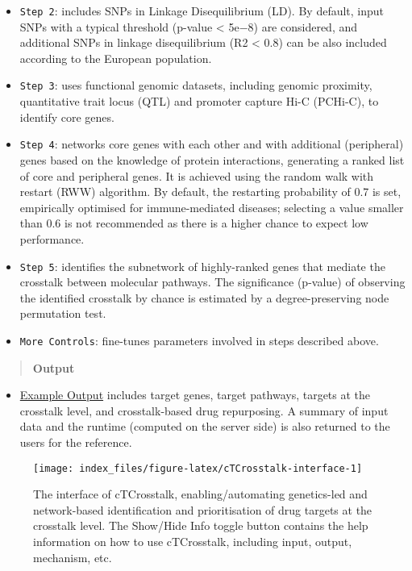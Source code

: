 \documentclass[
  oneside]{book}
\providecommand{\tightlist}{%
  \setlength{\itemsep}{0pt}\setlength{\parskip}{0pt}}
\begin{document}
\begin{itemize}
\item
  \texttt{Step\ 2}: includes SNPs in Linkage Disequilibrium (LD). By default, input SNPs with a typical threshold (p-value \textless{} 5e−8) are considered, and additional SNPs in linkage disequilibrium (R2 \textless{} 0.8) can be also included according to the European population.
\item
  \texttt{Step\ 3}: uses functional genomic datasets, including genomic proximity, quantitative trait locus (QTL) and promoter capture Hi-C (PCHi-C), to identify core genes.
\item
  \texttt{Step\ 4}: networks core genes with each other and with additional (peripheral) genes based on the knowledge of protein interactions, generating a ranked list of core and peripheral genes. It is achieved using the random walk with restart (RWW) algorithm. By default, the restarting probability of 0.7 is set, empirically optimised for immune-mediated diseases; selecting a value smaller than 0.6 is not recommended as there is a higher chance to expect low performance.
\item
  \texttt{Step\ 5}: identifies the subnetwork of highly-ranked genes that mediate the crosstalk between molecular pathways. The significance (p-value) of observing the identified crosstalk by chance is estimated by a degree-preserving node permutation test.
\item
  \texttt{More\ Controls}: fine-tunes parameters involved in steps described above.
\end{itemize}

\begin{quote}
\textbf{Output}
\end{quote}

\begin{itemize}
\tightlist
\item
  \href{http://www.genetictargets.com/app/examples/_tmp_RMD_cTCrosstalk.html}{Example Output} includes target genes, target pathways, targets at the crosstalk level, and crosstalk-based drug repurposing. A summary of input data and the runtime (computed on the server side) is also returned to the users for the reference.
\end{itemize}

\begin{figure}

{\centering \texttt{[image: index\_files/figure-latex/cTCrosstalk-interface-1]} 

}

\caption{The interface of cTCrosstalk, enabling/automating genetics-led and network-based identification and prioritisation of drug targets at the crosstalk level. The Show/Hide Info toggle button contains the help information on how to use cTCrosstalk, including input, output, mechanism, etc.}\label{fig:cTCrosstalk-interface}
\end{figure}
\end{document}
